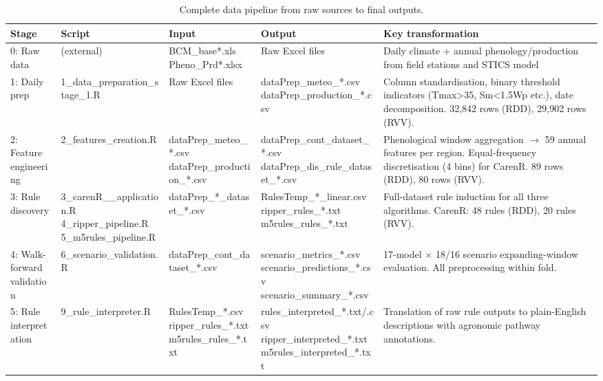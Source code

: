 \begin{table}[htbp]
  \centering
  \caption{Complete data pipeline from raw sources to final outputs.}\label{tab:ch3d_6}
  \small
  \begin{adjustbox}{max width=\textwidth}
    \begin{tabularx}{\textwidth}{p{1.5cm}|p{2.4cm}|p{2.2cm}|p{2.4cm}|X}
  \toprule
  Stage & Script & Input & Output & Key transformation \\
  \midrule
  0: Raw data & (external) & BCM\_base*.xls
Pheno\_Prd*.xlsx & Raw Excel files & Daily climate + annual phenology/production from field stations and STICS model \\
  1: Daily prep & 1\_data\_preparation\_stage\_1.R & Raw Excel files & dataPrep\_meteo\_*.csv
dataPrep\_production\_*.csv & Column standardisation, binary threshold indicators (Tmax>35, Sm<1.5Wp etc.), date decomposition. 32,842 rows (RDD), 29,902 rows (RVV). \\
  2: Feature engineering & 2\_features\_creation.R & dataPrep\_meteo\_*.csv
dataPrep\_production\_*.csv & dataPrep\_cont\_dataset\_*.csv
dataPrep\_dis\_rule\_dataset\_*.csv & Phenological window aggregation $\rightarrow$ 59 annual features per region. Equal-frequency discretisation (4 bins) for CarenR. 89 rows (RDD), 80 rows (RVV). \\
  3: Rule discovery & 3\_carenR\_\_application.R
4\_ripper\_pipeline.R
5\_m5rules\_pipeline.R & dataPrep\_*\_dataset\_*.csv & RulesTemp\_*\_linear.csv
ripper\_rules\_*.txt
m5rules\_rules\_*.txt & Full-dataset rule induction for all three algorithms. CarenR: 48 rules (RDD), 20 rules (RVV). \\
  4: Walk-forward validation & 6\_scenario\_validation.R & dataPrep\_cont\_dataset\_*.csv & scenario\_metrics\_*.csv
scenario\_predictions\_*.csv
scenario\_summary\_*.csv & 17-model $\times$ 18/16 scenario expanding-window evaluation. All preprocessing within fold. \\
  5: Rule interpretation & 9\_rule\_interpreter.R & RulesTemp\_*.csv
ripper\_rules\_*.txt
m5rules\_rules\_*.txt & rules\_interpreted\_*.txt/.csv
ripper\_interpreted\_*.txt
m5rules\_interpreted\_*.txt & Translation of raw rule outputs to plain-English descriptions with agronomic pathway annotations. \\
  \bottomrule
\end{tabularx}
  \end{adjustbox}
\end{table}

